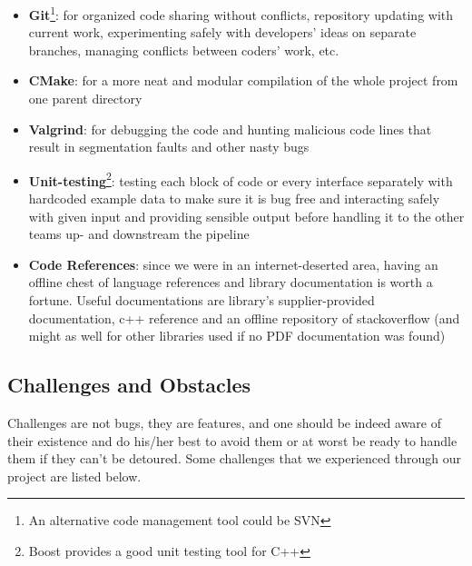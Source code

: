 \begin{itemize}
  \item \textbf{Git}\footnote{An alternative code management tool could be SVN}: for organized code sharing without conflicts, repository updating with current work, experimenting safely with developers' ideas on separate branches, managing conflicts between coders' work, etc.
  \item \textbf{CMake}: for a more neat and modular compilation of the whole project from one parent directory
  \item \textbf{Valgrind}: for debugging the code and hunting malicious code lines that result in segmentation faults and other nasty bugs
  \item \textbf{Unit-testing}\footnote{Boost provides a good unit testing tool for C++}: testing each block of code or every interface separately with hardcoded example data to make sure it is bug free and interacting safely with given input and providing sensible output before handling it to the other teams up- and downstream the pipeline\label{unit_testing}
  \item \textbf{Code References}: since we were in an internet-deserted area, having an offline chest of language references and library documentation is worth a fortune. Useful documentations are library's supplier-provided documentation, c++ reference and an offline repository of stackoverflow (and might as well for other libraries used if no PDF documentation was found)
\end{itemize}

\subsection{Challenges and Obstacles}
Challenges are not bugs, they are features, and one should be indeed aware of their existence and do his/her best to avoid them or at worst be ready to handle them if they can't be detoured. Some challenges that we experienced through our project are listed below.

